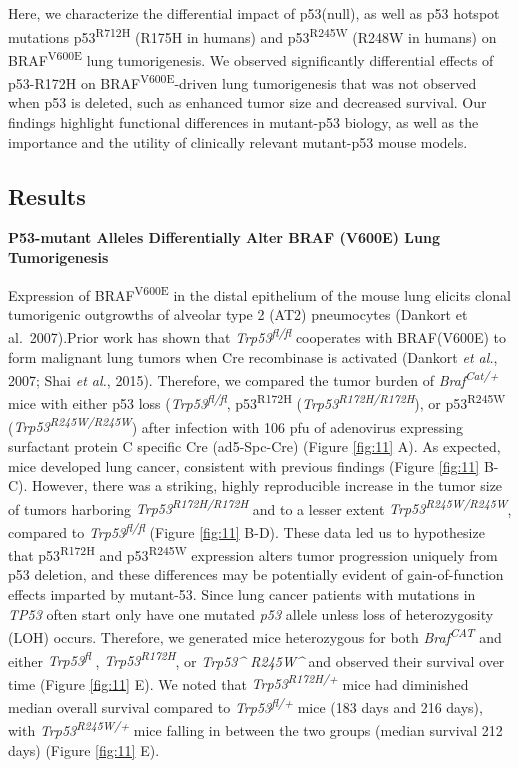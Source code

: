 Here, we characterize the differential impact of p53(null), as well as p53 hotspot mutations p53\textsuperscript{R712H} (R175H in humans) and p53\textsuperscript{R245W} (R248W in humans) on BRAF\textsuperscript{V600E} lung tumorigenesis. We observed significantly differential effects of p53-R172H on BRAF\textsuperscript{V600E}-driven lung tumorigenesis that was not observed when p53 is deleted, such as enhanced tumor size and decreased survival. Our findings highlight functional differences in mutant-p53 biology, as well as the importance and the utility of clinically relevant mutant-p53 mouse models.

\hypertarget{results-1}{%
\subsection{Results}\label{results-1}}

\textbf{P53-mutant Alleles Differentially Alter BRAF (V600E) Lung Tumorigenesis}

Expression of BRAF\textsuperscript{V600E} in the distal epithelium of the mouse lung elicits clonal tumorigenic outgrowths of alveolar type 2 (AT2) pneumocytes (Dankort et al.~2007).Prior work has shown that \emph{Trp53\textsuperscript{fl/fl}} cooperates with BRAF(V600E) to form malignant lung tumors when Cre recombinase is activated (Dankort \emph{et al.}, 2007; Shai \emph{et al.}, 2015). Therefore, we compared the tumor burden of \emph{Braf\textsuperscript{Cat/+}} mice with either p53 loss (\emph{Trp53\textsuperscript{fl/fl}}, p53\textsuperscript{R172H} (\emph{Trp53\textsuperscript{R172H/R172H}}), or p53\textsuperscript{R245W} (\emph{Trp53\textsuperscript{R245W/R245W}}) after infection with 106 pfu of adenovirus expressing surfactant protein C specific Cre (ad5-Spc-Cre) (Figure \ref{fig:11} A). As expected, mice developed lung cancer, consistent with previous findings (Figure \ref{fig:11} B-C). However, there was a striking, highly reproducible increase in the tumor size of tumors harboring \emph{Trp53\textsuperscript{R172H/R172H}} and to a lesser extent \emph{Trp53\textsuperscript{R245W/R245W}}, compared to \emph{Trp53\textsuperscript{fl/fl}} (Figure \ref{fig:11} B-D). These data led us to hypothesize that p53\textsuperscript{R172H} and p53\textsuperscript{R245W} expression alters tumor progression uniquely from p53 deletion, and these differences may be potentially evident of gain-of-function effects imparted by mutant-53. Since lung cancer patients with mutations in \emph{TP53} often start only have one mutated \emph{p53} allele unless loss of heterozygosity (LOH) occurs. Therefore, we generated mice heterozygous for both \emph{Braf\textsuperscript{CAT}} and either \emph{Trp53\textsuperscript{fl}} , \emph{Trp53\textsuperscript{R172H}}, or \emph{Trp53\^{} R245W\^{}} and observed their survival over time (Figure \ref{fig:11} E). We noted that \emph{Trp53\textsuperscript{R172H/+}} mice had diminished median overall survival compared to \emph{Trp53\textsuperscript{fl/+}} mice (183 days and 216 days), with \emph{Trp53\textsuperscript{R245W/+}} mice falling in between the two groups (median survival 212 days) (Figure \ref{fig:11} E).

